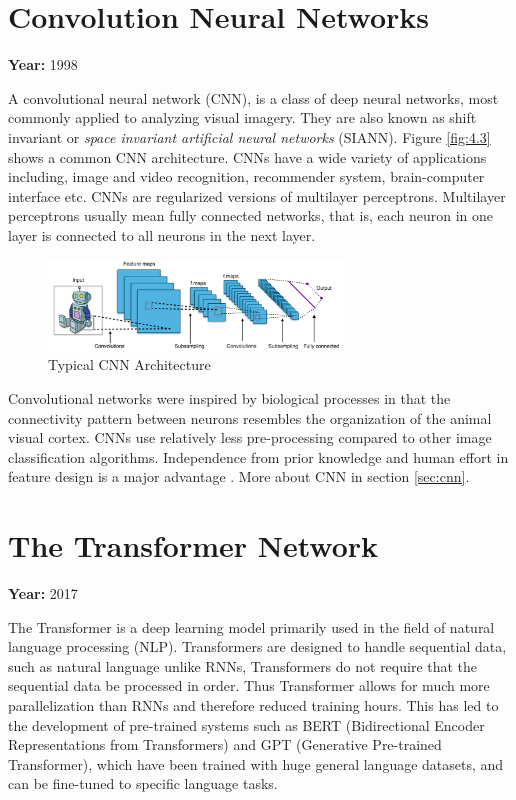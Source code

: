 \documentclass[12pt, a4paper]{report}
\begin{document}
\section{Convolution Neural Networks}
\label{sec:cnnlr}

\textbf{Year:} 1998

A convolutional neural network (CNN), is a class of deep neural networks, most commonly applied to analyzing visual imagery. They are also known as shift invariant or \emph{space invariant artificial neural networks} (SIANN). Figure \eqref{fig:4.3} shows a common CNN architecture. CNNs have a wide variety of applications including, image and video recognition, recommender system, brain-computer interface etc. CNNs are regularized versions of multilayer perceptrons. Multilayer perceptrons usually mean fully connected networks, that is, each neuron in one layer is connected to all neurons in the next layer.

\begin{figure}[!htbp]
    \centering
    \includegraphics[width=0.7\textwidth]{Typical_cnn.png}
    \caption[Typical CNN Architecture]{Typical CNN Architecture \cite{wiki:cnns}}
    \label{fig:4.3}
\end{figure}

Convolutional networks were inspired by biological processes in that the connectivity pattern between neurons resembles the organization of the animal visual cortex. CNNs use relatively less pre-processing compared to other image classification algorithms. Independence from prior knowledge and human effort in feature design is a major advantage \cite{wiki:cnns}. More about CNN in section \eqref{sec:cnn}.

\section{The Transformer Network}
\label{sec:ttn}

\textbf{Year:} 2017

The Transformer is a deep learning model primarily used in the field of natural language processing (NLP). Transformers are designed to handle sequential data, such as natural language unlike RNNs, Transformers do not require that the sequential data be processed in order. Thus Transformer allows for much more parallelization than RNNs and therefore reduced training hours. This has led to the development of pre-trained systems such as BERT (Bidirectional Encoder Representations from Transformers) and GPT (Generative Pre-trained Transformer), which have been trained with huge general language datasets, and can be fine-tuned to specific language tasks.
\end{document}

